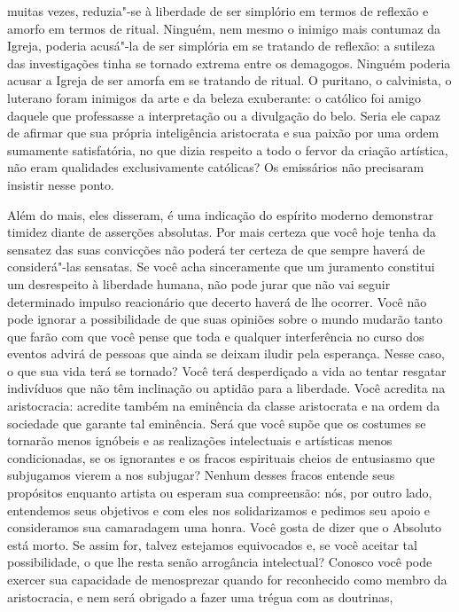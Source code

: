 muitas vezes, reduzia"-se à liberdade de ser simplório em termos de
reflexão e amorfo em termos de ritual.  Ninguém, nem mesmo o inimigo
mais contumaz da Igreja, poderia acusá"-la de ser simplória em se
tratando de reflexão: a sutileza das investigações tinha se tornado
extrema entre os demagogos.  Ninguém poderia acusar a Igreja de ser
amorfa em se tratando de ritual.  O puritano, o calvinista, o luterano
foram inimigos da arte e da beleza exuberante: o católico foi amigo
daquele que professasse a interpretação ou a divulgação do belo.  Seria
ele capaz de afirmar que sua própria inteligência aristocrata e sua
paixão por uma ordem sumamente satisfatória, no que dizia respeito a
todo o fervor da criação artística, não eram qualidades exclusivamente
católicas?  Os emissários não precisaram insistir nesse ponto.

Além do mais, eles disseram, é uma indicação do espírito moderno
demonstrar timidez diante de asserções absolutas.  Por mais certeza que
você hoje tenha da sensatez das suas convicções não poderá ter certeza
de que sempre haverá de considerá"-las sensatas.  Se você acha
sinceramente que um juramento constitui um desrespeito à liberdade
humana, não pode jurar que não vai seguir determinado impulso
reacionário que decerto haverá de lhe ocorrer.  Você não pode ignorar a
possibilidade de que suas opiniões sobre o mundo mudarão tanto que
farão com que você pense que toda e qualquer interferência no curso dos
eventos advirá de pessoas que ainda se deixam iludir pela esperança. 
Nesse caso, o que sua vida terá se tornado?  Você terá desperdiçado a
vida ao tentar resgatar indivíduos que não têm inclinação ou aptidão
para a liberdade.  Você acredita na aristocracia: acredite também na
eminência da classe aristocrata e na ordem da sociedade que garante tal
eminência.  Será que você supõe que os costumes se tornarão menos
ignóbeis e as realizações intelectuais e artísticas menos
condicionadas, se os ignorantes e os fracos espirituais cheios de
entusiasmo que subjugamos vierem a nos subjugar?  Nenhum desses fracos
entende seus propósitos enquanto artista ou esperam sua compreensão:
nós, por outro lado, entendemos seus objetivos e com eles nos
solidarizamos e pedimos seu apoio e consideramos sua camaradagem uma
honra.  Você gosta de dizer que o Absoluto está morto.  Se assim for,
talvez estejamos equivocados e, se você aceitar tal possibilidade, o
que lhe resta senão arrogância intelectual?  Conosco você pode exercer
sua capacidade de menosprezar quando for reconhecido como membro da
aristocracia, e nem será obrigado a fazer uma trégua com as doutrinas,
